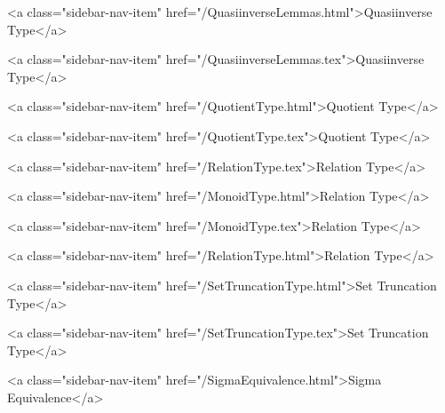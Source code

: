       
    
      
        
          <a class="sidebar-nav-item" href="/QuasiinverseLemmas.html">Quasiinverse Type</a>
        
      
    
      
        
          <a class="sidebar-nav-item" href="/QuasiinverseLemmas.tex">Quasiinverse Type</a>
        
      
    
      
        
          <a class="sidebar-nav-item" href="/QuotientType.html">Quotient Type</a>
        
      
    
      
        
          <a class="sidebar-nav-item" href="/QuotientType.tex">Quotient Type</a>
        
      
    
      
        
          <a class="sidebar-nav-item" href="/RelationType.tex">Relation Type</a>
        
      
    
      
        
          <a class="sidebar-nav-item" href="/MonoidType.html">Relation Type</a>
        
      
    
      
        
          <a class="sidebar-nav-item" href="/MonoidType.tex">Relation Type</a>
        
      
    
      
        
          <a class="sidebar-nav-item" href="/RelationType.html">Relation Type</a>
        
      
    
      
        
          <a class="sidebar-nav-item" href="/SetTruncationType.html">Set Truncation Type</a>
        
      
    
      
        
          <a class="sidebar-nav-item" href="/SetTruncationType.tex">Set Truncation Type</a>
        
      
    
      
        
          <a class="sidebar-nav-item" href="/SigmaEquivalence.html">Sigma Equivalence</a>
        
